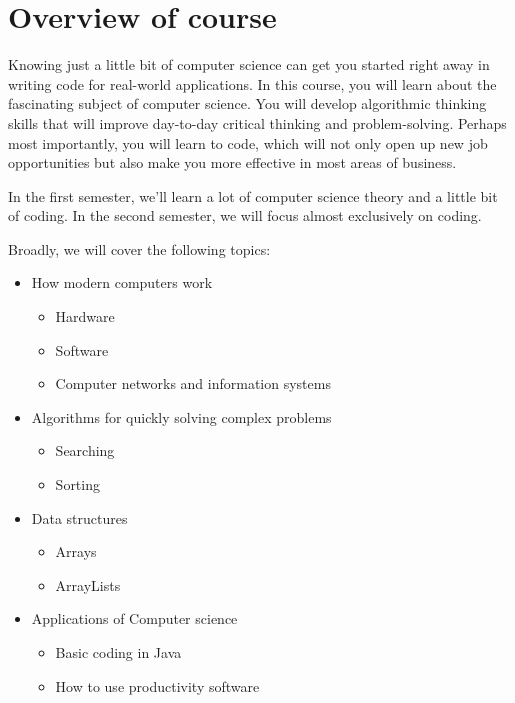 \section{Overview of course}

Knowing just a little bit of computer science can get you started right away in
writing code for real-world applications. In this course, you will learn about
the fascinating subject of computer science. You will develop algorithmic
thinking skills that will improve day-to-day critical thinking and
problem-solving. Perhaps most importantly, you will learn to code, which will
not only open up new job opportunities but also make you more effective in most
areas of business.

In the first semester, we'll learn a lot of computer science theory and a little bit of coding. In the second semester, we will focus almost exclusively on coding. 

Broadly, we will cover the following topics:
\begin{itemize}
    \item How modern computers work
    	\begin{itemize}
       		\item Hardware
       		\item Software
       		\item Computer networks and information systems
    	\end{itemize}
    \item Algorithms for quickly solving complex problems
    	\begin{itemize}
       		\item Searching
       		\item Sorting
    	\end{itemize}
    \item Data structures 
    	\begin{itemize}
       		\item Arrays
       		\item ArrayLists
    	\end{itemize}
    \item Applications of Computer science
    	\begin{itemize}
       		\item Basic coding in Java
       		\item How to use productivity software
    	\end{itemize}
    \end{itemize}
